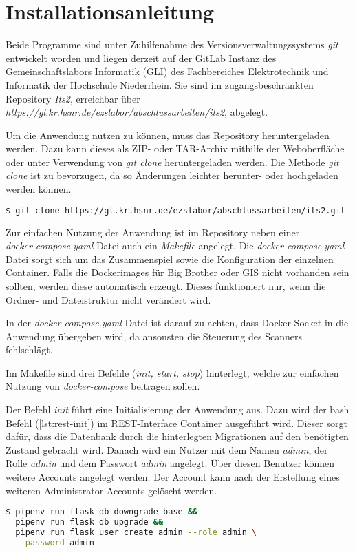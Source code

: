 \section{Installationsanleitung}
Beide Programme sind unter Zuhilfenahme des Versionsverwaltungssystems \textit{git} entwickelt worden und liegen derzeit auf der GitLab Instanz des Gemeinschaftslabors Informatik (GLI) des Fachbereiches Elektrotechnik und Informatik der Hochschule Niederrhein. Sie sind im zugangsbeschränkten Repository \textit{Its2}, erreichbar über\\ \textit{https://gl.kr.hsnr.de/ezslabor/abschlussarbeiten/its2}, abgelegt.

Um die Anwendung nutzen zu können, muss das Repository heruntergeladen werden.
Dazu kann dieses als ZIP- oder TAR-Archiv mithilfe der Weboberfläche oder unter Verwendung von \textit{git clone} heruntergeladen werden. Die Methode \textit{git clone} ist zu bevorzugen, da so Änderungen leichter herunter- oder hochgeladen werden können.

\begin{lstlisting}[language=bash, caption={git clone (bash)}, captionpos=b, label={lst:git-clone}]
$ git clone https://gl.kr.hsnr.de/ezslabor/abschlussarbeiten/its2.git
\end{lstlisting}

Zur einfachen Nutzung der Anwendung ist im Repository neben einer \\
\textit{docker-compose.yaml} Datei auch ein \textit{Makefile} angelegt. Die \textit{docker-compose.yaml} Datei sorgt sich um das Zusammenspiel sowie die Konfiguration der einzelnen Container. Falls die Dockerimages für Big Brother oder GIS nicht vorhanden sein sollten, werden diese automatisch erzeugt. Dieses funktioniert nur, wenn die Ordner- und Dateistruktur nicht verändert wird.

In der \textit{docker-compose.yaml} Datei ist darauf zu achten, dass Docker Socket in die Anwendung übergeben wird, da ansonsten die Steuerung des Scanners fehlschlägt.

Im Makefile sind drei Befehle (\textit{init, start, stop}) hinterlegt, welche zur einfachen Nutzung von \textit{docker-compose} beitragen sollen.

Der Befehl \textit{init} führt eine Initialisierung der Anwendung aus. Dazu wird der bash Befehl (\ref{lst:rest-init}) im REST-Interface Container ausgeführt wird.
Dieser sorgt dafür, dass die Datenbank durch die hinterlegten Migrationen auf den benötigten Zustand gebracht wird. Danach wird ein Nutzer mit dem Namen \textit{admin}, der Rolle \textit{admin} und dem Passwort \textit{admin} angelegt. Über diesen Benutzer können weitere Accounts angelegt werden. Der Account kann nach der Erstellung eines weiteren Administrator-Accounts gelöscht werden.
\begin{lstlisting}[language=bash, caption={Initalisierung REST-Interface (bash)}, captionpos=b, label={lst:rest-init}]
$ pipenv run flask db downgrade base && 
  pipenv run flask db upgrade && 
  pipenv run flask user create admin --role admin \
  --password admin
\end{lstlisting}

